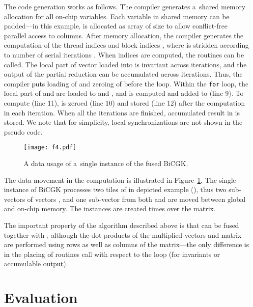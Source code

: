 \documentclass[final]{siamltex}
\begin{document}
{The code generation works as follows. The compiler generates a~shared memory allocation for all on-chip variables. Each variable in shared memory can be padded---in this example,  is allocated as array of size  to allow conflict-free parallel access to columns. After memory allocation, the compiler generates the computation of the thread indices and block indices , where  is stridden according to number of serial iterations . When indices are computed, the routines can be called. The local part of vector  loaded into  is invariant across iterations, and the output of the partial reduction  can be accumulated across iterations. Thus, the compiler puts loading of  and zeroing of  before the loop. Within the \texttt{for} loop, the local part of  and  are loaded to  and , and  is computed and added to  (line 9). To compute  (line 11),  is zeroed (line 10) and stored (line 12) after the computation in each iteration. When all the iterations are finished, accumulated result in  is stored. We note that for simplicity, local synchronizations are not shown in the pseudo code. 

\begin{figure}[h]
\centering
\texttt{[image: f4.pdf]}
\caption{A data usage of a~single instance of the fused BiCGK.}
\label{fig:gemv-ilustration}
\end{figure}

The data movement in the computation is illustrated in Figure~\ref{fig:gemv-ilustration}. The single instance of BiCGK processes two tiles of  in depicted example (), thus two sub-vectors of vectors , and one sub-vector from both  and  are moved between global and on-chip memory. The instances are created  times over the matrix.

The important property of the algorithm described above is that  can be fused together with , although the dot products of the multiplied vectors and matrix  are performed using rows as well as columns of the matrix---the only difference is in the placing of routines call with respect to the loop (for invariants or accumulable output).


















\section{Evaluation}
\label{sect:eval}

}
\end{document}
